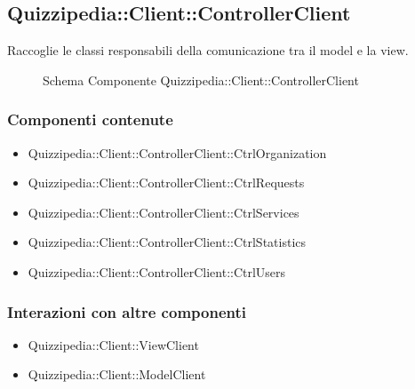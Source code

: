 \subsection{Quizzipedia::Client::ControllerClient}
Raccoglie le classi responsabili della comunicazione tra il model e la view.
\begin{figure}[H]
\centering
\noindent{}
\caption[Schema Componente Quizzipedia::Client::ControllerClient]{Schema Componente Quizzipedia::Client::ControllerClient}
\end{figure}
\subsubsection{Componenti contenute}
\begin{itemize}
\item Quizzipedia::Client::ControllerClient::CtrlOrganization
\item Quizzipedia::Client::ControllerClient::CtrlRequests
\item Quizzipedia::Client::ControllerClient::CtrlServices
\item Quizzipedia::Client::ControllerClient::CtrlStatistics
\item Quizzipedia::Client::ControllerClient::CtrlUsers
\end{itemize}
\subsubsection{Interazioni con altre componenti}
\begin{itemize}
\item Quizzipedia::Client::ViewClient
\end{itemize}
\begin{itemize}
\item Quizzipedia::Client::ModelClient
\end{itemize}
